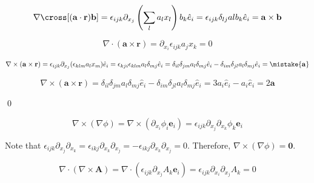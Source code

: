 \documentclass[12pt]{article}
\begin{document}
\begin{equation}
    \nabla \cross [(\mathbf{a} \cdot \mathbf{r}) \mathbf{b}] = \epsilon_{ijk} \partial_{x_{j}} \left( \sum_{l} a_{l} x_{l} \right) b_{k} \hat{e}_{i} = \epsilon_{ijk} \delta_{lj} al b_{k} \hat{e}_{i} = \mathbf{a} \times \mathbf{b}
\end{equation}


\begin{equation}
    \nabla \cdot (\mathbf{a} \times \mathbf{r}) = \partial_{x_{i}} \epsilon_{ijk} a_{j} x_{k} = 0
\end{equation}

\begin{equation}
    \nabla \times (\mathbf{a} \times \mathbf{r}) = \epsilon_{ijk} \partial_{x_{j}} (\epsilon_{klm} a_{l} x_{m}) \hat{e}_{i} = \epsilon_{kji} \epsilon_{klm} a_{l} \delta_{mj} \hat{e}_{i} = \delta_{il} \delta_{jm} a_{l} \delta_{mj} \hat{e}_{i}  - \delta_{im} \delta_{jl} a_{l} \delta_{mj} \hat{e}_{i} = \mistake{\mathbf{a}}
\end{equation}

\begin{correction}
    \begin{equation}
        \nabla \times (\mathbf{a} \times \mathbf{r}) = \delta_{il} \delta_{jm} a_{l} \delta_{mj} \hat{e}_{i}  - \delta_{im} \delta_{jl} a_{l} \delta_{mj} \hat{e}_{i} = 3 a_{i} \hat{e}_{i} - a_{i} \hat{e}_{i} = 2 \mathbf{a}
    \end{equation}
\end{correction}
\qed


\begin{equation}
    \nabla \times (\nabla \phi) = \nabla \times (\partial_{x_{i}} \phi_{i} \mathbf{e}_{i}) = \epsilon_{ijk} \partial_{x_{j}} \partial_{x_{k}} \phi_{k} \mathbf{e}_{i}
\end{equation}

Note that $\epsilon_{ijk} \partial_{x_{j}} \partial_{x_{k}} = \epsilon_{ikj} \partial_{x_{k}} \partial_{x_{j}} = - \epsilon_{ikj} \partial_{x_{k}} \partial_{x_{j}} = 0$. Therefore, $\nabla \times (\nabla \phi) = \mathbf{0}$.

\begin{equation}
    \nabla \cdot (\nabla \times \mathbf{A}) = \nabla \cdot (\epsilon_{ijk} \partial_{x_{j}} A_{k} \mathbf{e}_{i}) = \epsilon_{ijk} \partial_{x_{i}} \partial_{x_{j}} A_{k} = 0
\end{equation}
\end{document}
